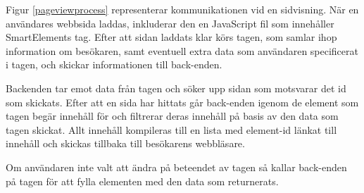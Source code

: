 Figur \ref{pageviewprocess} representerar kommunikationen vid en sidvisning. När en användares webbsida laddas, inkluderar den en JavaScript fil som innehåller SmartElements tag. Efter att sidan laddats klar körs tagen, som samlar ihop information om besökaren, samt eventuell extra data som användaren specificerat i tagen, och skickar informationen till back-enden.

Backenden tar emot data från tagen och söker upp sidan som motsvarar det id som skickats. Efter att en sida har hittats går back-enden igenom de element som tagen begär innehåll för och filtrerar deras innehåll på basis av den data som tagen skickat. Allt innehåll kompileras till en lista med element-id länkat till innehåll och skickas tillbaka till besökarens webbläsare.

Om användaren inte valt att ändra på beteendet av tagen så kallar back-enden på tagen för att fylla elementen med den data som returnerats.